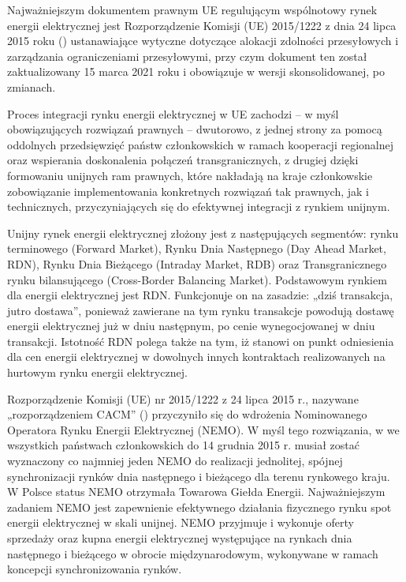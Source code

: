 \documentclass[polish, twoside, 12pt, a4paper]{article}
\theoremstyle{definition}
\theoremstyle{plain}
\theoremstyle{remark}
\begin{document}
Najważniejszym dokumentem prawnym UE regulującym wspólnotowy rynek energii elektrycznej jest Rozporządzenie Komisji (UE) 2015/1222 z dnia 24 lipca 2015 roku (\cite{ec2015}) ustanawiające wytyczne dotyczące alokacji zdolności przesyłowych i zarządzania ograniczeniami przesyłowymi, przy czym dokument ten został zaktualizowany 15 marca 2021 roku i obowiązuje w wersji skonsolidowanej, po zmianach. 

Proces integracji rynku energii elektrycznej w UE zachodzi – w myśl obowiązujących rozwiązań prawnych – dwutorowo, z jednej strony za pomocą oddolnych przedsięwzięć państw członkowskich w ramach kooperacji regionalnej oraz wspierania doskonalenia połączeń transgranicznych, z drugiej dzięki formowaniu unijnych ram prawnych, które nakładają na kraje członkowskie zobowiązanie implementowania konkretnych rozwiązań tak prawnych, jak i technicznych, przyczyniających się do efektywnej integracji z rynkiem unijnym. 

Unijny rynek energii elektrycznej złożony jest z następujących segmentów: rynku terminowego (Forward Market), Rynku Dnia Następnego (Day Ahead Market, RDN), Rynku Dnia Bieżącego (Intraday Market, RDB) oraz Transgranicznego rynku bilansującego (Cross-Border Balancing Market). Podstawowym rynkiem dla energii elektrycznej jest RDN. Funkcjonuje on na zasadzie: „dziś transakcja, jutro dostawa”, ponieważ zawierane na tym rynku transakcje powodują dostawę energii elektrycznej już w dniu następnym, po cenie wynegocjowanej w dniu transakcji. Istotność RDN polega także na tym, iż stanowi on punkt odniesienia dla cen energii elektrycznej w dowolnych innych kontraktach realizowanych na hurtowym rynku energii elektrycznej.

Rozporządzenie Komisji (UE) nr 2015/1222 z 24 lipca 2015 r., nazywane „rozporządzeniem CACM” (\cite{ec2015}) przyczyniło się do wdrożenia Nominowanego Operatora Rynku Energii Elektrycznej (NEMO). W myśl tego rozwiązania, w we wszystkich państwach członkowskich do 14 grudnia 2015 r. musiał zostać wyznaczony co najmniej jeden NEMO do realizacji jednolitej, spójnej synchronizacji rynków dnia następnego i bieżącego dla terenu rynkowego kraju. W Polsce status NEMO otrzymała Towarowa Giełda Energii. Najważniejszym zadaniem NEMO jest zapewnienie efektywnego działania fizycznego rynku spot energii elektrycznej w skali unijnej. NEMO przyjmuje i wykonuje oferty sprzedaży oraz kupna energii elektrycznej występujące na rynkach dnia następnego i bieżącego w obrocie międzynarodowym, wykonywane w ramach koncepcji synchronizowania rynków. 
\end{document}
